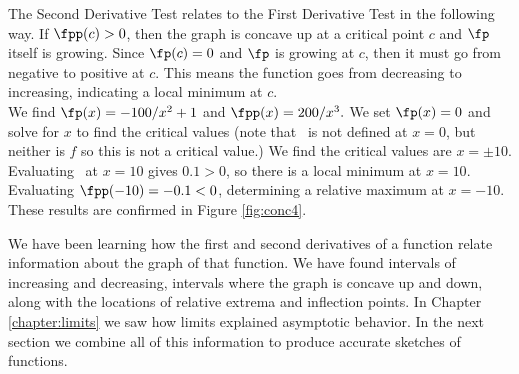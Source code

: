 
The Second Derivative Test relates to the First Derivative Test in the following way. If $\fpp(c)>0$, then the graph is concave up at a critical point $c$ and $\fp$ itself is growing.  Since $\fp(c)=0$ and $\fp$ is growing at $c$, then it must go from negative to positive at $c$.  This means the function goes from decreasing to increasing, indicating a local minimum at $c$.\\

{We find $\fp(x)=-100/x^2+1$ and $\fpp(x) = 200/x^3.$  We set $\fp(x)=0$ and solve for $x$ to find the critical values (note that \fp\ is not defined at $x=0$, but neither is $f$ so this is not a critical value.) We find  the critical values are $x=\pm 10$.  Evaluating \fpp\ at $x=10$ gives $0.1>0$, so there is a local minimum at $x=10$.  Evaluating $\fpp(-10)=-0.1<0$, determining a relative maximum at  $x=-10$. These results are confirmed in Figure \ref{fig:conc4}.
}\\


We have been learning how the first and second derivatives of a function relate information about the graph of that function. We have found intervals of increasing and decreasing, intervals where the graph is concave up and down, along with the locations of relative extrema and inflection points. In Chapter \ref{chapter:limits} we saw how limits explained asymptotic behavior. In the next section we combine all of this information to produce accurate sketches of functions.


